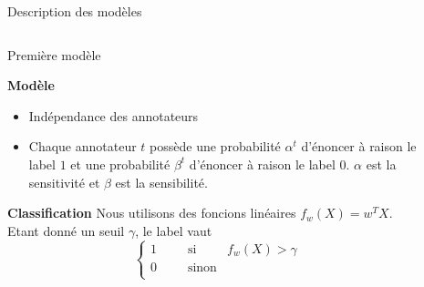 \documentclass[final]{beamer}
\newlength{\sepwid}
\newlength{\onecolwid}
\newlength{\twocolwid}
\begin{document}
\begin{frame}[t]
\begin{columns}[t]
\begin{column}{\onecolwid}



\end{column} %

\begin{column}{\sepwid}\end{column} %

\begin{column}{\twocolwid} %
\vspace{-1cm}
\begin{block}{Description des modèles}

\begin{columns}[t,totalwidth=\twocolwid] %

\begin{column}{\onecolwid} %


\begin{alertblock}{Première modèle}

\newline
\newline
\textbf{Modèle}
\begin{itemize}
    \item Indépendance des annotateurs
    \item Chaque annotateur $t$ possède une probabilité $\alpha^t$ d'énoncer à raison le label $1$ et une probabilité  $\beta^t$ d'énoncer à raison le label $0$. \newline $\alpha$ est la sensitivité et $\beta$ est la sensibilité.
\end{itemize}

\par

\textbf{Classification}
Nous utilisons des foncions linéaires $ f_w(X) = w^T X$. Etant donné un seuil $\gamma$, le label vaut
$$\left\{ \begin{array}{llcl}
1 & \;\;\; &\text{si } & f_w(X) > \gamma \\
 0 &\;\;\; &\text{sinon} &  \\
\end{array} \right.$$
\noindent



\end{alertblock}
\end{column}
\end{columns}
\end{block}
\end{column}
\end{columns}
\end{frame}
\end{document}
